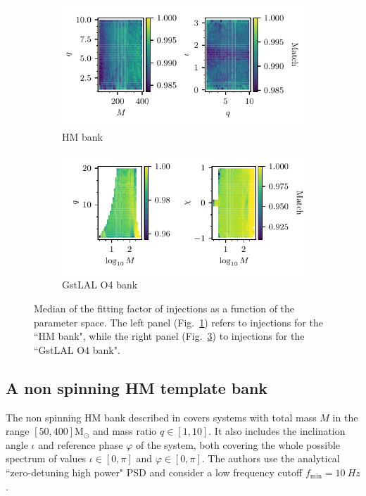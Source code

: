 \documentclass[twocolumn,showpacs,preprintnumbers,nofootinbib,prd,
superscriptaddress,10pt]{revtex4-2}
\begin{document}
\begin{figure}[t]
	\centering
	\begin{subfigure}[t]{0.49\textwidth}
		\includegraphics[scale = 1.]{symphony_HM_injections}
		\caption{HM bank \cite{Harry:2017weg}}
		\label{fig:symphony_HM_injections}
	\end{subfigure}
	\hfill
	\begin{subfigure}[t]{0.49\textwidth}
		\includegraphics[scale = 1.]{bank_O4_injections}
		\caption{GstLAL O4 bank \cite{Sakon:2022ibh}}
		\label{fig:bank_O4_injections}
	\end{subfigure}
	\caption{Median of the fitting factor of injections as a function of the parameter space. The left panel (Fig.~\ref{fig:symphony_HM_injections}) refers to injections for the ``HM bank", while the right panel (Fig.~\ref{fig:bank_O4_injections}) to injections for the ``GstLAL O4 bank".}
\end{figure}

\subsection{A non spinning HM template bank} \label{sec:HM_comparison}

The non spinning HM bank described in \cite{Harry:2017weg} covers systems with total mass $M$ in the range $[50, 400] \mathrm{M_\odot}$ and mass ratio $q\in [1,10]$. It also includes the inclination angle $\iota$ and reference phase $\varphi$ of the system, both covering the whole possible spectrum of values $\iota\in [0,\pi]$ and $\varphi\in [0,\pi]$.
The authors use the analytical ``zero-detuning high power" PSD \cite{OLD_PSDs} and consider a low frequency cutoff $f_\text{min} = \SI{10}{Hz}$.
\end{document}
